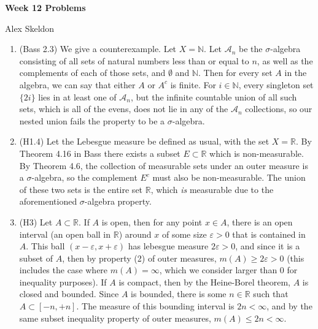 \documentclass[11pt]{article}
\newcommand{\mytitlecompact}[1]{{

\hfill
{\Large \sffamily \bfseries{#1}}
\hfill
}}
\def\N{{\mathbb{N}}}
\def\R{{\mathbb{R}}}
\begin{document}
\mytitlecompact{Week 12 Problems}
\nolinebreak \begin{center} Alex Skeldon \end{center}

\begin{enumerate}
  \item (Bass 2.3) We give a counterexample. Let $X = \N$. Let $\mathcal{A}_n$ be the $\sigma$-algebra consisting of all sets of natural numbers less than or equal to $n$, as well as the complements of each of those sets, and $\emptyset$ and $\N$. Then for every set $A$ in the algebra, we can say that either $A$ or $A^c$ is finite. For $i \in \N$, every singleton set $\lbrace 2i \rbrace$ lies in at least one of $\mathcal{A}_n$, but the infinite countable union of all such sets, which is all of the evens, does not lie in any of the $\mathcal{A}_n$ collections, so our nested union fails the property to be a $\sigma$-algebra.
  
\item (H1.4) Let the Lebesgue measure be defined as usual, with the set $X = \R$. By Theorem 4.16 in Bass there exists a subset $E \subset \R$ which is non-measurable. By Theorem 4.6, the collection of measurable sets under an outer measure is a $\sigma$-algebra, so the complement $E^c$ must also be non-measurable. The union of these two sets is the entire set $\R$, which \textit{is} measurable due to the aforementioned $\sigma$-algebra property.

\item (H3) Let $A \subset \R$. If $A$ is open, then for any point $x \in A$, there is an open interval (an open ball in $\R$) around $x$ of some size $\varepsilon > 0$ that is contained in $A$. This ball $(x - \varepsilon, x + \varepsilon)$ has lebesgue measure $2 \varepsilon > 0$, and since it is a subset of $A$, then by property (2) of outer measures, $m(A) \geq 2\varepsilon > 0$ (this includes the case where $m(A) = \infty$, which we consider larger than 0 for inequality purposes).
\newline \text{\qquad} If $A$ is compact, then by the Heine-Borel theorem, $A$ is closed and bounded. Since $A$ is bounded, there is some $n \in \R$ such that $A \subset [-n,+n]$. The measure of this bounding interval is $2n < \infty$, and by the same subset inequality property of outer measures, $m(A) \leq 2n < \infty$.
\end{enumerate}
\end{document}

